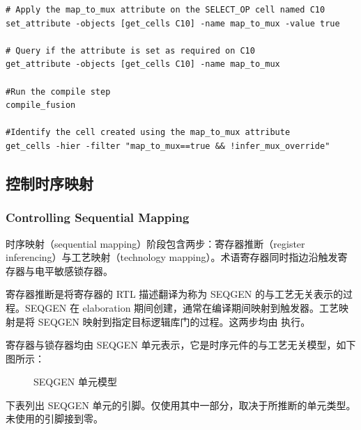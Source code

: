 \begin{lstlisting}[caption={使用 map\_to\_mux 属性实现特定多路复用逻辑（原书 Example 16）},label={ex:map-to-mux}]
# Apply the map_to_mux attribute on the SELECT_OP cell named C10
set_attribute -objects [get_cells C10] -name map_to_mux -value true

# Query if the attribute is set as required on C10
get_attribute -objects [get_cells C10] -name map_to_mux

#Run the compile step
compile_fusion

#Identify the cell created using the map_to_mux attribute
get_cells -hier -filter "map_to_mux==true && !infer_mux_override"
\end{lstlisting}

\subsection{控制时序映射}
\subsubsection*{Controlling Sequential Mapping}

时序映射（sequential mapping）阶段包含两步：寄存器推断（register inferencing）与工艺映射（technology mapping）。术语寄存器同时指边沿触发寄存器与电平敏感锁存器。

寄存器推断是将寄存器的 RTL 描述翻译为称为 SEQGEN 的与工艺无关表示的过程。SEQGEN 在 elaboration 期间创建，通常在编译期间映射到触发器。工艺映射是将 SEQGEN 映射到指定目标逻辑库门的过程。这两步均由  执行。

寄存器与锁存器均由 SEQGEN 单元表示，它是时序元件的与工艺无关模型，如下图所示：

\begin{figure}[htbp]
\centering
{}
\caption{SEQGEN 单元模型}
\label{fig:seqgen}
\end{figure}

下表列出 SEQGEN 单元的引脚。仅使用其中一部分，取决于所推断的单元类型。未使用的引脚接到零。

